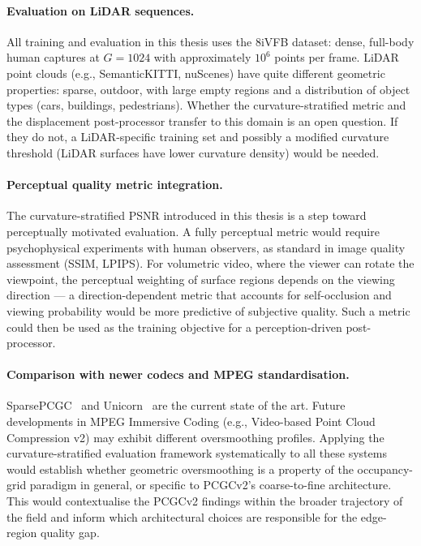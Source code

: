\paragraph{Evaluation on LiDAR sequences.}
All training and evaluation in this thesis uses the 8iVFB dataset: dense,
full-body human captures at $G = 1024$ with approximately $10^6$ points per
frame.
LiDAR point clouds (e.g., SemanticKITTI, nuScenes) have quite different
geometric properties: sparse, outdoor, with large empty regions
and a distribution of object types (cars, buildings, pedestrians).
Whether the curvature-stratified metric and the displacement post-processor
transfer to this domain is an open question.
If they do not, a LiDAR-specific training set and possibly a modified
curvature threshold (LiDAR surfaces have lower curvature density) would be
needed.

\paragraph{Perceptual quality metric integration.}
The curvature-stratified PSNR introduced in this thesis is a step toward
perceptually motivated evaluation.
A fully perceptual metric would require psychophysical experiments with
human observers, as standard in image quality assessment (SSIM, LPIPS).
For volumetric video, where the viewer can rotate the viewpoint, the
perceptual weighting of surface regions depends on the viewing direction ---
a direction-dependent metric that accounts for self-occlusion and viewing
probability would be more predictive of subjective quality.
Such a metric could then be used as the training objective for a
perception-driven post-processor.

\paragraph{Comparison with newer codecs and MPEG standardisation.}
SparsePCGC~\cite{wang2023sparsepcgc} and Unicorn~\cite{wang2025unicorn}
are the current state of the art.
Future developments in MPEG Immersive Coding (e.g., Video-based Point Cloud
Compression v2) may exhibit different oversmoothing profiles.
Applying the curvature-stratified evaluation framework systematically to all
these systems would establish whether geometric oversmoothing is a property
of the occupancy-grid paradigm in general, or specific to PCGCv2's
coarse-to-fine architecture.
This would contextualise the PCGCv2 findings within the broader trajectory
of the field and inform which architectural choices are responsible for the
edge-region quality gap.

